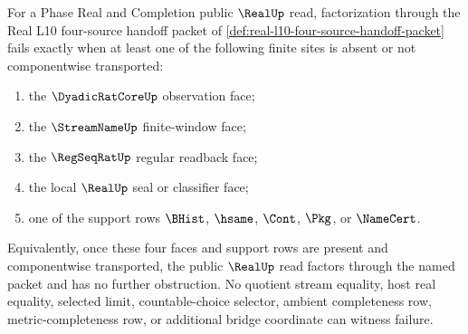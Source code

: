 \begin{theorem}
\label{thm:real-l10-four-source-handoff-obstruction-classification}
For a Phase Real and Completion public $\RealUp$ read, factorization through the Real L10 four-source handoff packet of \autoref{def:real-l10-four-source-handoff-packet} fails exactly when at least one of the following finite sites is absent or not componentwise transported:
\begin{enumerate}
\item the $\DyadicRatCoreUp$ observation face;
\item the $\StreamNameUp$ finite-window face;
\item the $\RegSeqRatUp$ regular readback face;
\item the local $\RealUp$ seal or classifier face;
\item one of the support rows $\BHist$, $\hsame$, $\Cont$, $\Pkg$, or $\NameCert$.
\end{enumerate}
Equivalently, once these four faces and support rows are present and componentwise transported, the public $\RealUp$ read factors through the named packet and has no further obstruction. No quotient stream equality, host real equality, selected limit, countable-choice selector, ambient completeness row, metric-completeness row, or additional bridge coordinate can witness failure.
\end{theorem}

